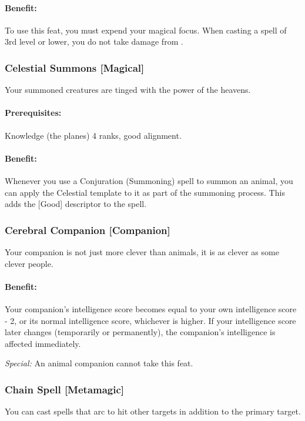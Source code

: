 \paragraph{Benefit:} To use this feat, you must expend your magical focus. When casting a spell of 3rd level or lower, you do not take damage from .
\subsubsection[Celestial Summons]{Celestial Summons [Magical]}
\label{Feat:CelestialSummons}
Your summoned creatures are tinged with the power of the heavens.

\paragraph{Prerequisites:} Knowledge (the planes) 4 ranks, good alignment.

\paragraph{Benefit:} Whenever you use a Conjuration (Summoning) spell to summon an animal, you can apply the Celestial template to it as part of the summoning process. This adds the [Good] descriptor to the spell.
\subsubsection[Cerebral Companion]{Cerebral Companion [Companion]}
\label{Feat:CerebralCompanion}
Your companion is not just more clever than animals, it is as clever as some clever people.

\paragraph{Benefit:} Your companion's intelligence score becomes equal to your own intelligence score - 2, or its normal intelligence score, whichever is higher. If your intelligence score later changes (temporarily or permanently), the companion's intelligence is affected immediately.

\emph{Special:} An animal companion cannot take this feat.
\subsubsection[Chain Spell]{Chain Spell [Metamagic]}
\label{Feat:ChainSpell}
You can cast spells that arc to hit other targets in addition to the primary target. 

